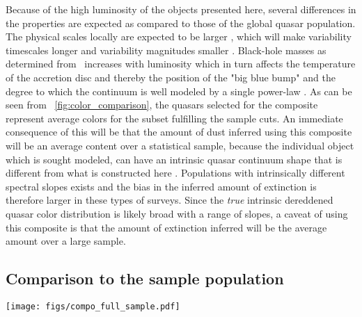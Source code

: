 \documentclass{aa}    %
\newcommand{\figref}[1]{\ref{fig:#1}}
\newcommand{\Fig}[1]{\figurename~\figref{#1}}
\newcommand{\fig}[1]{\Fig{#1}}
\newcommand{\figlabel}[1]{\label{fig:#1}}
\newcommand{\sectionname}{Sect.}
\newcommand{\Sect}[1]{\sectionname~\ref{sect:#1}}
\newcommand{\sect}[1]{\Sect{#1}}
\newcommand{\sectlabel}[1]{\label{sect:#1}}
\newcommand{\mgii}{\ion{Mg}{ii}}
\begin{document}
Because of the high luminosity of the objects presented here, several
differences in the properties are expected as compared to those of the
global quasar population. The physical scales locally are expected to
be larger \citep{Bentz2013}, which will make variability timescales
longer and variability magnitudes smaller \citep{VandenBerk2004,
  Schmidt2012}. Black-hole masses as determined from \mgii~increases
with luminosity \citep{wu2015} which in turn affects the temperature
of the accretion disc \citep{shakura1973, Pereyra2006} and thereby the
position of the "big blue bump" and the degree to which the continuum
is well modeled by a single power-law \citep[see also][for a
  discussion]{Lusso2015}. As can be seen from \fig{color_comparison},
the quasars selected for the composite represent average colors for
the subset fulfilling the sample cuts. An immediate consequence of
this will be that the amount of dust inferred using this composite
will be an average content over a statistical sample, because the
individual object which is sought modeled, can have an intrinsic
quasar continuum shape that is different from what is constructed here
\citep{Richards2003, Hopkins2004}. Populations with intrinsically
different spectral slopes exists \citep{Glikman2012, Krawczyk2015} and
the bias in the inferred amount of extinction is therefore larger in
these types of surveys. Since the \textit{true} intrinsic dereddened
quasar color distribution is likely broad with a range of slopes, a
caveat of using this composite is that the amount of extinction
inferred will be the average amount over a large sample.



\subsection{Comparison to the sample population}  \sectlabel{sample_pop}


\begin{figure*}[t!]
\centering
\texttt{[image: figs/compo\_full\_sample.pdf]}
\caption[]{X-shooter \textbf{weighted arithmetic mean} quasar composite on a linear wavelength
scale in light brown. The positions of several prominent emission lines are
marked. Overplotted in dark green is the corresponding composite generated from
the full sample of SDSS quasars fulfilling the selection criteria and general
agreement is observed, albeit with a brighter Balmer continuum in the
SDSS-constructed composite. In purple is shown the results from fitting both a
pure and a broken power-law to the regions specified in \sect{results} and they
are observed to be indistinguishable.}
\figlabel{composite}
\end{figure*}
\end{document}
